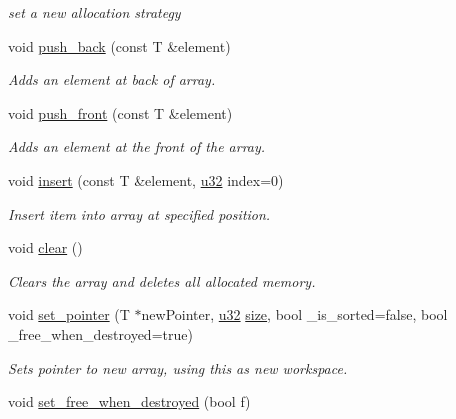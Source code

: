 \begin{DoxyCompactItemize}
\begin{DoxyCompactList}\small\item\em set a new allocation strategy \end{DoxyCompactList}\item 
void \hyperlink{classirr_1_1core_1_1array_ad2c9dff8592b95c25c59f5383fc633fe}{push\+\_\+back} (const T \&element)
\begin{DoxyCompactList}\small\item\em Adds an element at back of array. \end{DoxyCompactList}\item 
void \hyperlink{classirr_1_1core_1_1array_a31b686ce4b1ebae930f22bc40d30efbd}{push\+\_\+front} (const T \&element)
\begin{DoxyCompactList}\small\item\em Adds an element at the front of the array. \end{DoxyCompactList}\item 
void \hyperlink{classirr_1_1core_1_1array_a3b0f73c95dd449a4de576c6b1943566c}{insert} (const T \&element, \hyperlink{namespaceirr_a0416a53257075833e7002efd0a18e804}{u32} index=0)
\begin{DoxyCompactList}\small\item\em Insert item into array at specified position. \end{DoxyCompactList}\item 
\mbox{\label{classirr_1_1core_1_1array_a236e08ca44ddf3c2b47b726f90db8d39}} 
void \hyperlink{classirr_1_1core_1_1array_a236e08ca44ddf3c2b47b726f90db8d39}{clear} ()
\begin{DoxyCompactList}\small\item\em Clears the array and deletes all allocated memory. \end{DoxyCompactList}\item 
void \hyperlink{classirr_1_1core_1_1array_a75df5c46b08225d1ebe3c1381d85d9ff}{set\+\_\+pointer} (T $\ast$new\+Pointer, \hyperlink{namespaceirr_a0416a53257075833e7002efd0a18e804}{u32} \hyperlink{classirr_1_1core_1_1array_ab10777d1bb278c29e159ec59b5dc9378}{size}, bool \+\_\+is\+\_\+sorted=false, bool \+\_\+free\+\_\+when\+\_\+destroyed=true)
\begin{DoxyCompactList}\small\item\em Sets pointer to new array, using this as new workspace. \end{DoxyCompactList}\item 
void \hyperlink{classirr_1_1core_1_1array_afddd43e25d3ad6b1a3d75ceab13e6c56}{set\+\_\+free\+\_\+when\+\_\+destroyed} (bool f)

\end{DoxyCompactItemize}
